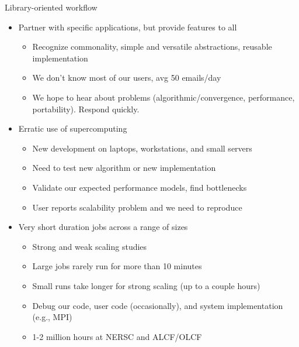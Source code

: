 \documentclass{beamer}
\begin{document}
\begin{frame}{Library-oriented workflow}
  \begin{itemize}
  \item Partner with specific applications, but provide features to all
    \begin{itemize}
    \item Recognize commonality, simple and versatile abstractions, reusable implementation
    \item We don't know most of our users, avg 50 emails/day
    \item We hope to hear about problems (algorithmic/convergence, performance, portability).
      Respond quickly.
    \end{itemize}
  \item Erratic use of supercomputing
    \begin{itemize}
    \item New development on laptops, workstations, and small servers
    \item Need to test new algorithm or new implementation
    \item Validate our expected performance models, find bottlenecks
    \item User reports scalability problem and we need to reproduce
    \end{itemize}
  \item Very short duration jobs across a range of sizes
    \begin{itemize}
    \item Strong and weak scaling studies
    \item Large jobs rarely run for more than 10 minutes
    \item Small runs take longer for strong scaling (up to a couple hours)
    \item Debug our code, user code (occasionally), and system implementation (e.g., MPI)
    \item 1-2 million hours at NERSC and ALCF/OLCF
    \end{itemize}
  \end{itemize}
\end{frame}
\end{document}
